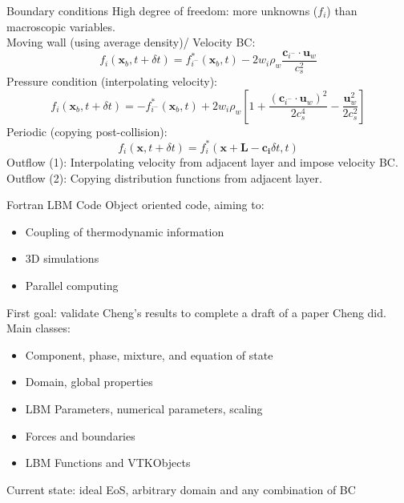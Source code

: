 \documentclass{beamer}
\begin{document}
	\begin{frame}{Boundary conditions}
		High degree of freedom: more unknowns ($f_i$) than macroscopic variables.\\
		Moving wall (using average density)/ Velocity BC:
		\begin{equation*}
			f_{i}(\mathbf{x}_b,t+\delta t) = f^*_{i^-}(\mathbf{x}_b,t) - 2 w_i \rho_w \frac{\mathbf{c}_{i^-} \cdot \mathbf{u}_w}{c_s^2}
		\end{equation*}
		Pressure condition (interpolating velocity):
		\begin{equation*}
			f_{i}(\mathbf{x}_b,t + \delta t) = - f^*_{i^-}(\mathbf{x}_b,t) + 2 w_i \rho_w \left[1+\frac{(\mathbf{c}_{i^-} \cdot \mathbf{u}_w)^2}{2c_s^4} - \frac{\mathbf{u}^2_w}{2c^2_s} \right]
		\end{equation*}
		Periodic (copying post-collision):
		\begin{equation*}
			f_{i}(\mathbf{x},t + \delta t) = f^*_{i}(\mathbf{x+L-c_i}\delta t,t) 
		\end{equation*}
		Outflow (1): Interpolating velocity from adjacent layer and impose velocity BC.\\
		Outflow (2): Copying distribution functions from adjacent layer. 
	\end{frame}

	\begin{frame}{Fortran LBM Code}
		Object oriented code, aiming to:
		\begin{itemize}
			\item Coupling of thermodynamic information
			\item 3D simulations
			\item Parallel computing
		\end{itemize}
		First goal: validate Cheng's results to complete a draft of a paper Cheng did. Main classes:
		\begin{itemize}
			\item Component, phase, mixture, and equation of state
			\item Domain, global properties
			\item LBM Parameters, numerical parameters, scaling
			\item Forces and boundaries 
			\item LBM Functions and VTKObjects
		\end{itemize}
		\alert{Current state: ideal EoS, arbitrary domain and any combination of BC}
	\end{frame}
\end{document}
